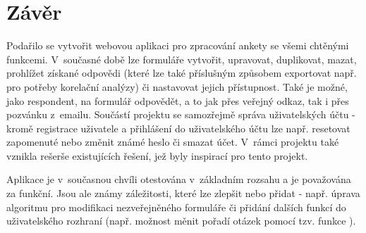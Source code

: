 \chapter{Závěr}
Podařilo se vytvořit webovou aplikaci pro zpracování ankety se všemi chtěnými funkcemi. V~současné době lze formuláře vytvořit, upravovat, duplikovat, mazat, prohlížet získané odpovědi (které lze také příslušným způsobem exportovat např. pro potřeby korelační analýzy) či nastavovat jejich přístupnost. Také je možné, jako respondent, na formulář odpovědět, a to jak přes veřejný odkaz, tak i přes pozvánku z~emailu. Součástí projektu se samozřejmě správa uživatelských účtu - kromě registrace uživatele a přihlášení do uživatelského účtu lze např. resetovat zapomenuté nebo změnit známé heslo či smazat účet. V~rámci projektu také vznikla rešerše existujících řešení, jež byly inspirací pro tento projekt.

Aplikace je v~současnou chvíli otestována v~základním rozsahu a je považována za funkční. Jsou ale známy záležitosti, které lze zlepšit nebo přidat - např. úprava algoritmu pro modifikaci nezveřejněného formuláře či přidání dalších funkcí do uživatelského rozhraní (např. možnost měnit pořadí otázek pomocí tzv. funkce ).
